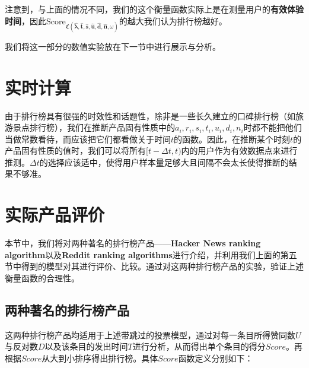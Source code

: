 \documentclass[UTF8]{ctexart}
\theoremstyle{plain}
\theoremstyle{definition}
\theoremstyle{remark}
\begin{document}
	注意到，与上面的情况不同，我们的这个衡量函数实际上是在测量用户的\textbf{有效体验时间}，因此$\mathrm{Score}_{\mathfrak{C}\left(\bm{\hat{\lambda}}, \bm{\hat{t}}, \bm{\hat{s}}, \bm{\hat{u}}, \bm{\hat{d}}, \bm{\hat{n}},\omega\right)}$的越大我们认为排行榜越好。
	
	我们将这一部分的数值实验放在下一节中进行展示与分析。
	
	\section{实时计算}
	由于排行榜具有很强的时效性和话题性，除非是一些长久建立的口碑排行榜（如旅游景点排行榜），我们在推断产品固有性质中的$a_i,r_i,s_i,t_i,u_i,d_i,n_i$时都不能把他们当做常数看待，而应该把它们都看做关于时间$t$的函数。因此，在推断某个时刻$t$的产品固有性质的值时，我们可以将所有$[t-\Delta t,t)$内的用户作为有效数据点来进行推测。$\Delta t$的选择应该适中，使得用户样本量足够大且间隔不会太长使得推断的结果不够准。
	\section{实际产品评价}
    本节中，我们将对两种著名的排行榜产品——\textbf{Hacker News ranking algorithm}以及\textbf{Reddit ranking algorithms}进行介绍，并利用我们上面的第五节中得到的模型对其进行评价、比较。通过对这两种排行榜产品的实验，验证上述衡量函数的合理性。
	\subsection{两种著名的排行榜产品}
    这两种排行榜产品均适用于上述带跳过的投票模型，通过对每一条目所得赞同数$U$与反对数$D$以及该条目的发出时间$T$进行分析，从而得出单个条目的得分$Score$。再根据$Score$从大到小排序得出排行榜。具体$Score$函数定义分别如下：
\end{document}
